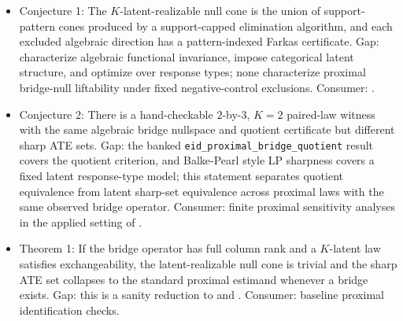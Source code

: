 \documentclass[11pt]{article}
\theoremstyle{definition}
\theoremstyle{plain}
\theoremstyle{remark}
\begin{document}
\begin{itemize}[leftmargin=*]
\item Conjecture 1: The \(K\)-latent-realizable null cone is the union of support-pattern cones produced by a support-capped elimination algorithm, and each excluded algebraic direction has a pattern-indexed Farkas certificate. Gap: \citet{ZhangLiMiaoTchetgen2023} characterize algebraic functional invariance, \citet{ShiMiaoNelsonTchetgen2020} impose categorical latent structure, and \citet{BalkePearl1997} optimize over response types; none characterize proximal bridge-null liftability under fixed negative-control exclusions. Consumer: \citet{GhassamiShpitserTchetgen2024}.
\item Conjecture 2: There is a hand-checkable \(2\)-by-\(3\), \(K=2\) paired-law witness with the same algebraic bridge nullspace and quotient certificate but different sharp ATE sets. Gap: the banked \texttt{eid\_proximal\_bridge\_quotient} result covers the quotient criterion, and Balke-Pearl style LP sharpness covers a fixed latent response-type model; this statement separates quotient equivalence from latent sharp-set equivalence across proximal laws with the same observed bridge operator. Consumer: finite proximal sensitivity analyses in the applied setting of \citet{ZivichColeEdwardsMulhollandShookSaTchetgen2023}.
\item Theorem 1: If the bridge operator has full column rank and a \(K\)-latent law satisfies exchangeability, the latent-realizable null cone is trivial and the sharp ATE set collapses to the standard proximal estimand whenever a bridge exists. Gap: this is a sanity reduction to \citet{MiaoGengTchetgen2018} and \citet{CuiPuShiMiaoTchetgen2024}. Consumer: baseline proximal identification checks.
\end{itemize}
\end{document}
